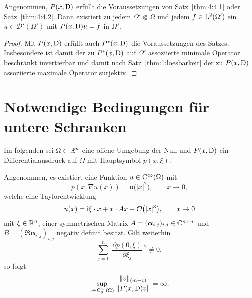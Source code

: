 \begin{cor}
Angenommen, $P(x,\mathrm D)$ erfüllt die Voraussetzungen von Satz~\ref{thm:4:4.1} oder Satz~\ref{thm:4:4.2}. Dann existiert zu jedem $\Omega'\Subset\Omega$ und jedem
$f\in\mathrm L^2(\Omega')$ ein $u\in\mathscr D'(\Omega')$ mit $P(x,\mathrm D)u=f$ in $\Omega'$.
\end{cor}
\begin{proof}
Mit $P(x,\mathrm D)$ erfüllt auch $P^*(x,\mathrm D)$ die Voraussetzungen des Satzes. Insbesondere ist damit der zu $P^*(x,\mathrm D)$ auf $\Omega'$ assoziierte minimale Operator beschränkt invertierbar und damit nach Satz~\ref{thm:1:loesbarkeit} der zu $P(x,\mathrm D)$ assoziierte maximale Operator surjektiv.
\end{proof}

\section{Notwendige Bedingungen für untere Schranken}
Im folgenden sei $\Omega \subset \mathbb R^n$ eine offene Umgebung der Null und $P(x,\mathrm D)$ ein Differentialausdruck auf $\Omega$ mit Hauptsymbol $p(x,\xi)$. 
\begin{lem}\label{lem1:hoer2.2}
Angenommen, es existiert eine Funktion $u \in \mathrm C^\infty (\Omega)$ mit 
\begin{equation}
\label{grad}
p(x, \nabla u(x)) = \mathbf{o} \big(|x|^2\big), \qquad  x \rightarrow 0,
\end{equation}
welche eine Taylorentwicklung 
\begin{equation}\label{taylor}
u(x) = \mathrm i \xi\cdot x + x\cdot A x + \mathcal O\big(|x|^3\big),\qquad x\to0
\end{equation}
mit $\xi\in\mathbb R^n$, einer symmetrischen Matrix $A=(\boldsymbol\alpha_{i,j})_{i,j}\in\mathbb C^{n\times n}$ und $B = (\Re \boldsymbol\alpha_{i,j})_{i,j} $ negativ definit  besitzt. 
Gilt weiterhin  
\begin{equation}
\label{normpart}
\sum_{j=1}^{n}\bigg|\frac{\partial p(0,\xi)}{\partial \xi_j}\bigg|^2 \neq 0,
\end{equation}
so folgt
\begin{equation}
\label{lm 1 eq}
\sup_{v\in\mathrm C_0^\infty(\Omega)} \frac{ \lVert v \rVert_{(m-1)} }{ \lVert P(x,\mathrm D)v \rVert} = \infty.
\end{equation}
\end{lem}
